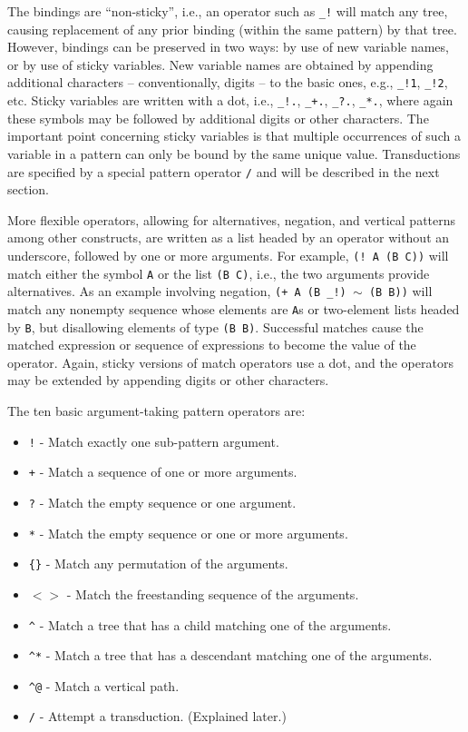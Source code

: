 \documentclass[a4,11pt]{article}
\begin{document}
The bindings are ``non-sticky'', i.e., an operator such as \texttt{\_!} will match any tree, causing replacement of any prior binding (within the same pattern) by that tree. However, bindings can be preserved in two ways: by use of new variable names, or by use of sticky variables. New variable names are obtained by appending additional characters -- conventionally, digits -- to the basic ones, e.g., \texttt{\_!1}, \texttt{\_!2}, etc. Sticky variables are written with a dot, i.e., \texttt{\_!.}, \texttt{\_+.}, \texttt{\_?.}, \texttt{\_*.}, where again these symbols may be followed by additional digits or other characters. The important point concerning sticky variables is that multiple occurrences of such a variable in a pattern can only be bound by the same unique value. Transductions are specified by a special pattern operator \texttt{/} and will be described in the next section.

More flexible operators, allowing for alternatives, negation, and vertical patterns among other constructs, are written as a list headed by an operator without an underscore, followed by one or more arguments. For example, \texttt{(! A (B C))} will match either the symbol \texttt{A} or the list \texttt{(B C)}, i.e., the two arguments provide alternatives. As an example involving negation, \texttt{(+ A (B \_!) $\sim$ (B B))} will match any nonempty sequence whose elements are \texttt{A}s or two-element lists headed by \texttt{B}, but disallowing elements of type \texttt{(B B)}. Successful matches cause the matched expression or sequence of expressions to become the value of the operator. Again, sticky versions of match operators use a dot, and the operators may be extended by appending digits or other characters. 

The ten basic  argument-taking pattern operators are:
\begin {itemize}
\item  \texttt{!}   - Match exactly one sub-pattern argument.
\item  \texttt{+}   - Match a sequence of one or more arguments.
\item  \texttt{?}   - Match the empty sequence or one argument.
\item  \texttt{*}   - Match the empty sequence or one or more arguments.
\item  \texttt{\{\}}  - Match any permutation of the arguments.
\item  \texttt{$<>$}  - Match the freestanding sequence of the arguments.
\item  \texttt{\^}    - Match a tree that has a child matching one of the arguments.
\item  \texttt{\^{}*}    - Match a tree that has a descendant matching one of the arguments.
\item  \texttt{\^{}@}   - Match a vertical path.
\item  \texttt{/}   - Attempt a transduction. (Explained later.)
\end {itemize}
\end{document}
